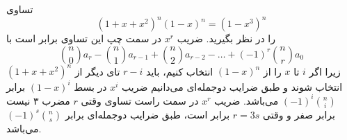 \p
تساوی
$$(1 + x + x^2)^n(1 - x)^n = (1 - x^3)^n$$
 را در نظر بگیرید. ضریب $x^r$ در سمت چپ این تساوی برابر است با
$${n \choose 0}a_r - {n \choose 1}a_{r - 1} + {n \choose 2}a_{r - 2} - \dots + (-1)^r{n \choose r}a_0$$
زیرا اگر $i$ تا $x$
را از
$(1-x)^n$
انتخاب کنیم، باید $r-i$
تای دیگر از 
$(1+x+x^2)^n$
انتخاب شوند
و طبق ضرایب دوجمله‌ای می‌دانیم ضریب 
$x^i$
در بسط
$(1-x)^i$ 
برابر 
$(-1)^i {n \choose i}$
می‌باشد.
 ضریب
$x^r$ 
در سمت راست تساوی وقتی
$r$ مضرب ۳ نیست برابر صفر و وقتی
$r = 3s$ برابر
است، طبق ضرایب دوجمله‌ای برابر
$(-1)^s{n \choose s}$ می‌باشد.
